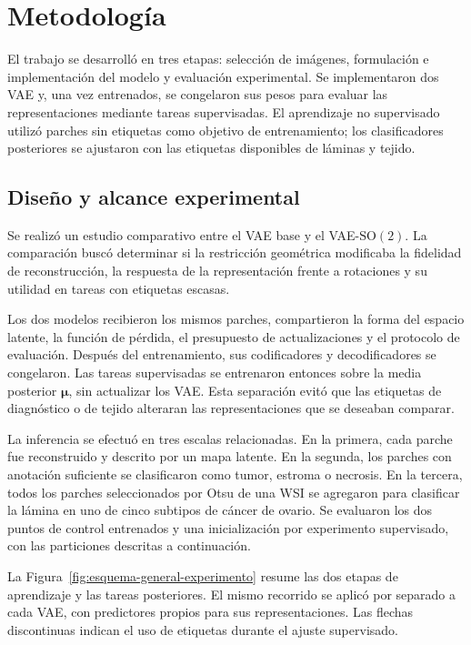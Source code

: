 \chapter{Metodología}

El trabajo se desarrolló en tres etapas: selección de imágenes,
formulación e implementación del modelo y evaluación experimental. Se implementaron dos VAE y,
una vez entrenados, se congelaron sus pesos para evaluar las representaciones
mediante tareas supervisadas. El aprendizaje no supervisado utilizó parches
sin etiquetas como objetivo de entrenamiento; los clasificadores posteriores
se ajustaron con las etiquetas disponibles de láminas y tejido.

\section{Diseño y alcance experimental}

Se realizó un estudio comparativo entre el VAE base y el VAE-\(\mathrm{SO}(2)\).
La comparación buscó
determinar si la restricción geométrica modificaba la fidelidad de
reconstrucción, la respuesta de la representación frente a rotaciones y su
utilidad en tareas con etiquetas escasas.

Los dos modelos recibieron los mismos parches, compartieron la forma del
espacio latente, la función de pérdida, el presupuesto de actualizaciones y el
protocolo de evaluación. Después del entrenamiento, sus codificadores y
decodificadores se congelaron. Las tareas supervisadas se entrenaron entonces
sobre la media posterior \(\boldsymbol{\mu}\), sin actualizar los VAE. Esta
separación evitó que las etiquetas de diagnóstico o de tejido alteraran las
representaciones que se deseaban comparar.

La inferencia se efectuó en tres escalas relacionadas. En la primera, cada
parche fue reconstruido y descrito por un mapa latente. En la segunda, los
parches con anotación suficiente se clasificaron como tumor, estroma o
necrosis. En la tercera, todos los parches seleccionados por Otsu de una WSI
se agregaron para clasificar la lámina en uno de cinco subtipos de cáncer de ovario. Se evaluaron los dos puntos de control entrenados y una inicialización por
experimento supervisado, con las particiones descritas a continuación.

La Figura~\ref{fig:esquema-general-experimento} resume las dos etapas de
aprendizaje y las tareas posteriores. El mismo recorrido se aplicó por
separado a cada VAE, con predictores propios para sus representaciones. Las
flechas discontinuas indican el uso de etiquetas durante el ajuste supervisado.

